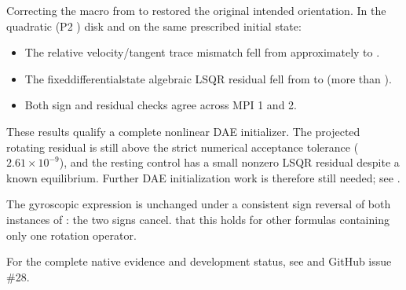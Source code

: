 \documentclass[letterpaper,10pt,english]{sphinxmanual}
\begin{document}
\sphinxAtStartPar
Correcting the macro from  to
 restored the original intended
orientation. In the quadratic (P2 ) disk and on
the same prescribed initial state:
\begin{itemize}
\item {} 
\sphinxAtStartPar
The relative velocity/tangent trace mismatch fell from
approximately  to .

\item {} 
\sphinxAtStartPar
The fixed\sphinxhyphen{}differential\sphinxhyphen{}state algebraic LSQR residual fell
from  to 
(more than ).

\item {} 
\sphinxAtStartPar
Both sign and residual checks agree across MPI 1 and 2.

\end{itemize}

\sphinxAtStartPar
These results  qualify a complete nonlinear DAE
initializer. The projected rotating residual is still above
the strict numerical acceptance tolerance
(\(2.61\times 10^{-9}\)), and the resting control has a
small nonzero LSQR residual despite a known equilibrium.
Further DAE initialization work is therefore still needed;
see {\hyperref[\detokenize{initialization::doc}]{}}.

\sphinxAtStartPar
The gyroscopic expression
 is unchanged under a
consistent sign reversal of both instances of :
the two signs cancel.  that this holds
for other formulas containing only one rotation operator.

\sphinxAtStartPar
For the complete native evidence and development status,
see 
and GitHub issue \#28.

\sphinxstepscope
\end{document}
